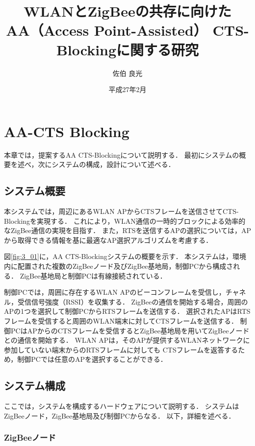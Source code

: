 \documentclass[12pt]{jreport}
\date{平成27年2月}
\title{\fontsize{15.5pt}{25pt}\selectfont WLANとZigBeeの共存に向けた\\AA（Access Point-Assisted） CTS-Blockingに関する研究}
\author{佐伯 良光}
\begin{document}
\maketitle


\chapter{AA-CTS Blocking}\label{implement}%
本章では，提案するAA CTS-Blockingについて説明する．
最初にシステムの概要を述べ，次にシステムの構成，設計について述べる．\\

\section{システム概要}

本システムでは，周辺にあるWLAN APからCTSフレームを送信させてCTS-Blockingを実現する．
これにより，WLAN通信の一時的ブロックによる効率的なZigBee通信の実現を目指す．
また，RTSを送信するAPの選択については，APから取得できる情報を基に最適なAP選択アルゴリズムを考慮する．

図\ref{fig:3_01}に，AA CTS-Blockingシステムの概要を示す．
本システムは，環境内に配置された複数のZigBeeノード及びZigBee基地局，制御PCから構成される．
ZigBee基地局と制御PCは有線接続されている．

制御PCでは，周囲に存在するWLAN APのビーコンフレームを受信し，チャネル，受信信号強度（RSSI）を収集する．
ZigBeeの通信を開始する場合，周囲のAPの1つを選択して制御PCからRTSフレームを送信する．
選択されたAPはRTSフレームを受信すると周囲のWLAN端末に対してCTSフレームを送信する．
制御PCはAPからのCTSフレームを受信するとZigBee基地局を用いてZigBeeノードとの通信を開始する．
WLAN APは，そのAPが提供するWLANネットワークに参加していない端末からのRTSフレームに対しても
CTSフレームを返答するため，制御PCでは任意のAPを選択することができる．

\section{システム構成}

ここでは，システムを構成するハードウェアについて説明する．
システムはZigBeeノード，ZigBee基地局及び制御PCからなる．
以下，詳細を述べる．

\subsection{ZigBeeノード}
\end{document}
